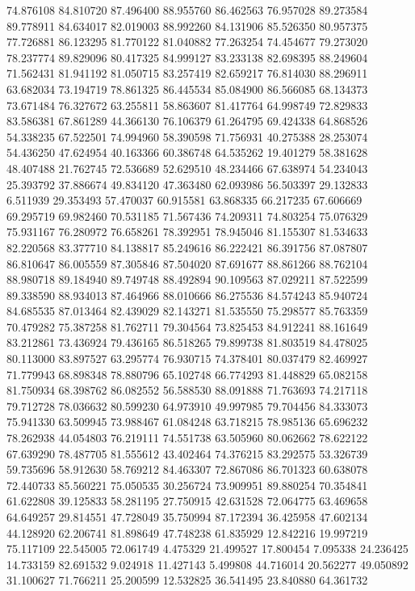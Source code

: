 74.876108
84.810720
87.496400
88.955760
86.462563
76.957028
89.273584
89.778911
84.634017
82.019003
88.992260
84.131906
85.526350
80.957375
77.726881
86.123295
81.770122
81.040882
77.263254
74.454677
79.273020
78.237774
89.829096
80.417325
84.999127
83.233138
82.698395
88.249604
71.562431
81.941192
81.050715
83.257419
82.659217
76.814030
88.296911
63.682034
73.194719
78.861325
86.445534
85.084900
86.566085
68.134373
73.671484
76.327672
63.255811
58.863607
81.417764
64.998749
72.829833
83.586381
67.861289
44.366130
76.106379
61.264795
69.424338
64.868526
54.338235
67.522501
74.994960
58.390598
71.756931
40.275388
28.253074
54.436250
47.624954
40.163366
60.386748
64.535262
19.401279
58.381628
48.407488
21.762745
72.536689
52.629510
48.234466
67.638974
54.234043
25.393792
37.886674
49.834120
47.363480
62.093986
56.503397
29.132833
6.511939
29.353493
57.470037
60.915581
63.868335
66.217235
67.606669
69.295719
69.982460
70.531185
71.567436
74.209311
74.803254
75.076329
75.931167
76.280972
76.658261
78.392951
78.945046
81.155307
81.534633
82.220568
83.377710
84.138817
85.249616
86.222421
86.391756
87.087807
86.810647
86.005559
87.305846
87.504020
87.691677
88.861266
88.762104
88.980718
89.184940
89.749748
88.492894
90.109563
87.029211
87.522599
89.338590
88.934013
87.464966
88.010666
86.275536
84.574243
85.940724
84.685535
87.013464
82.439029
82.143271
81.535550
75.298577
85.763359
70.479282
75.387258
81.762711
79.304564
73.825453
84.912241
88.161649
83.212861
73.436924
79.436165
86.518265
79.899738
81.803519
84.478025
80.113000
83.897527
63.295774
76.930715
74.378401
80.037479
82.469927
71.779943
68.898348
78.880796
65.102748
66.774293
81.448829
65.082158
81.750934
68.398762
86.082552
56.588530
88.091888
71.763693
74.217118
79.712728
78.036632
80.599230
64.973910
49.997985
79.704456
84.333073
75.941330
63.509945
73.988467
61.084248
63.718215
78.985136
65.696232
78.262938
44.054803
76.219111
74.551738
63.505960
80.062662
78.622122
67.639290
78.487705
81.555612
43.402464
74.376215
83.292575
53.326739
59.735696
58.912630
58.769212
84.463307
72.867086
86.701323
60.638078
72.440733
85.560221
75.050535
30.256724
73.909951
89.880254
70.354841
61.622808
39.125833
58.281195
27.750915
42.631528
72.064775
63.469658
64.649257
29.814551
47.728049
35.750994
87.172394
36.425958
47.602134
44.128920
62.206741
81.898649
47.748238
61.835929
12.842216
19.997219
75.117109
22.545005
72.061749
4.475329
21.499527
17.800454
7.095338
24.236425
14.733159
82.691532
9.024918
11.427143
5.499808
44.716014
20.562277
49.050892
31.100627
71.766211
25.200599
12.532825
36.541495
23.840880
64.361732
